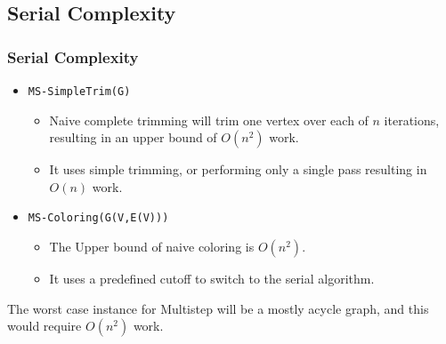 \subsection{Serial Complexity}
\begin{frame}
	\frametitle{Serial Complexity}
	\begin{itemize}
		\setlength\itemsep{0.5em}
		\item \texttt{MS-SimpleTrim(G)}
			\begin{itemize}
				\item Naive complete trimming will trim one vertex over each 
					of $n$ iterations, resulting in an upper bound of 
					$O(n^2)$ work.
				\item It uses simple trimming, or performing only a single pass
					resulting in $O(n)$ work.
			\end{itemize}
		\item \texttt{MS-Coloring(G(V,E(V)))}
			\begin{itemize}
				\item The Upper bound of naive coloring is $O(n^2)$.
				\item It uses a predefined cutoff to switch to the 
					serial algorithm.
			\end{itemize}
	\end{itemize}
	The worst case instance for Multistep will be a mostly acycle graph,
	and this would require $O(n^2)$ work.
\end{frame}
